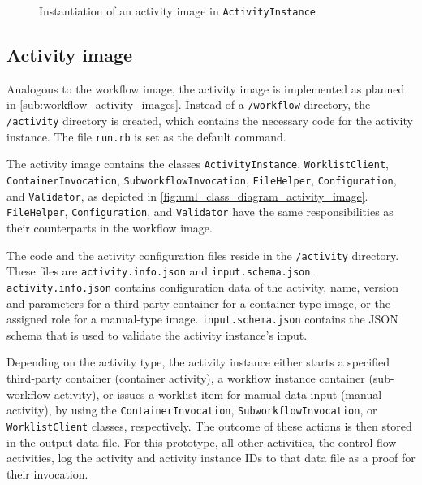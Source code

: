     \begin{figure}[htbp]
      \inputminted[firstline=40,lastline=68,fontsize=\footnotesize,linenos=true,numberblanklines=true,showspaces=false,breaklines=true,baselinestretch=1,gobble=2]{ruby}{../code/wf_base/activity_instance.rb}
      \caption[Instantiation of an activity image in ActivityInstance]{Instantiation of an activity image in \texttt{ActivityInstance}}
      \label{fig:instantiation_of_an_activity_image_in_activityinstance}
    \end{figure}


  \subsection{Activity image} %
  \label{sub:activity_containers}
    Analogous to the workflow image, the activity image is implemented as planned in \ref{sub:workflow_activity_images}. Instead of a \texttt{/workflow} directory, the \texttt{/activity} directory is created, which contains the necessary code for the activity instance. The file \texttt{run.rb} is set as the default command.

    The activity image contains the classes \texttt{ActivityInstance}, \texttt{WorklistClient}, \texttt{ContainerInvocation}, \texttt{SubworkflowInvocation}, \texttt{FileHelper}, \texttt{Configuration}, and \texttt{Validator}, as depicted in \ref{fig:uml_class_diagram_activity_image}.
    \texttt{FileHelper}, \texttt{Configuration}, and \texttt{Validator} have the same responsibilities as their counterparts in the workflow image.

    The code and the activity configuration files reside in the \texttt{/activity} directory. These files are \texttt{activity.info.json} and \texttt{input.schema.json}. \texttt{activity.info.json} contains configuration data of the activity, \eg name, version and parameters for a third-party container for a container-type image, or the assigned role for a manual-type image. \texttt{input.schema.json} contains the \ac{JSON} schema that is used to validate the activity instance's input.

    Depending on the activity type, the activity instance either starts a specified third-party container (container activity), a workflow instance container (sub-workflow activity), or issues a worklist item for manual data input (manual activity), by using the \texttt{ContainerInvocation}, \texttt{SubworkflowInvocation}, or \texttt{WorklistClient} classes, respectively. The outcome of these actions is then stored in the output data file. For this prototype, all other activities, \ie the control flow activities, log the activity and activity instance \acp{ID} to that data file as a proof for their invocation.

